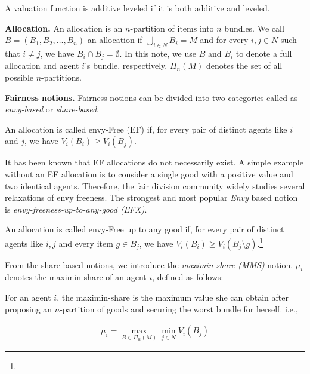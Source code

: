 \documentclass{article}
\theoremstyle{definition}
\begin{document}
\begin{definition}
    A valuation function is additive leveled if it is both additive and leveled.
\end{definition}

\textbf{Allocation.} An allocation is an $n\text{-partition}$ of items into $n$ bundles. We call $B = (B_1, B_2, \ldots, B_n)$ an allocation if $\bigcup\limits_{i \in N} B_i = M$ and for every $i, j \in N$ such that $i \neq j$, we have $B_i \cap B_j = \emptyset$. In this note, we use $B$ and $B_i$ to denote a full allocation and agent $i$'s bundle, respectively. $\Pi_n(M)$ denotes the set of all possible $n\text{-partitions}$.


\textbf{Fairness notions.} Fairness notions can be divided into two categories called as \emph{envy-based} or \emph{share-based}. 

\begin{definition}
    An allocation is called envy-Free (EF) if, for every pair of distinct agents like $i$ and $j$, we have $V_i(B_i) \ge V_i(B_j)$.
\end{definition}

It has been known that EF allocations do not necessarily exist. A simple example without an EF allocation is to consider a single good with a positive value and two identical agents. Therefore, the fair division community widely studies several relaxations of envy freeness. The strongest and most popular \emph{Envy} based notion is \emph{envy-freeness-up-to-any-good (EFX)}.

\begin{definition}
    An allocation is called envy-Free up to any good if, for every pair of distinct agents like $i, j$ and every item $g \in B_j$, we have $V_i(B_i) \ge V_i(B_j \setminus g)$.\footnote{}
\end{definition}

From the share-based notions, we introduce the \emph{maximin-share (MMS)} notion. $\mu_i$ denotes the maximin-share of an agent $i$, defined as follows:

\begin{definition}
    For an agent $i$, the maximin-share is the maximum value she can obtain after proposing an $n\text{-partition}$ of goods and securing the worst bundle for herself. i.e., 

    \begin{align*}
        \mu_i = \max\limits_{B \in \Pi_n(M)} \min\limits_{j \in N} V_i(B_j)
    \end{align*}
\end{definition}
\end{document}
